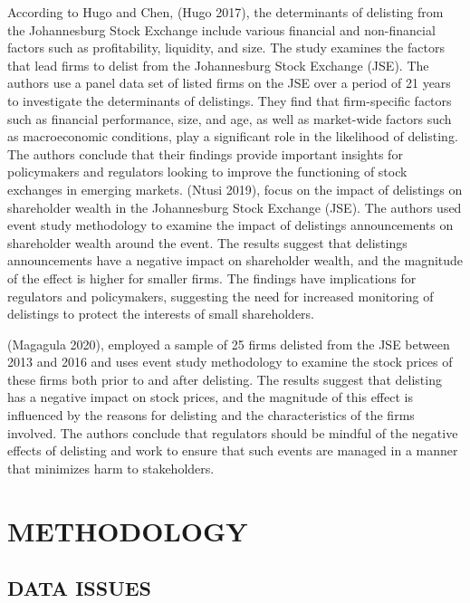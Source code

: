 \documentclass[
]{article}
\begin{document}
According to Hugo and Chen, (Hugo 2017), the determinants of delisting
from the Johannesburg Stock Exchange include various financial and
non-financial factors such as profitability, liquidity, and size. The
study examines the factors that lead firms to delist from the
Johannesburg Stock Exchange (JSE). The authors use a panel data set of
listed firms on the JSE over a period of 21 years to investigate the
determinants of delistings. They find that firm-specific factors such as
financial performance, size, and age, as well as market-wide factors
such as macroeconomic conditions, play a significant role in the
likelihood of delisting. The authors conclude that their findings
provide important insights for policymakers and regulators looking to
improve the functioning of stock exchanges in emerging markets. (Ntusi
2019), focus on the impact of delistings on shareholder wealth in the
Johannesburg Stock Exchange (JSE). The authors used event study
methodology to examine the impact of delistings announcements on
shareholder wealth around the event. The results suggest that delistings
announcements have a negative impact on shareholder wealth, and the
magnitude of the effect is higher for smaller firms. The findings have
implications for regulators and policymakers, suggesting the need for
increased monitoring of delistings to protect the interests of small
shareholders.

(Magagula 2020), employed a sample of 25 firms delisted from the JSE
between 2013 and 2016 and uses event study methodology to examine the
stock prices of these firms both prior to and after delisting. The
results suggest that delisting has a negative impact on stock prices,
and the magnitude of this effect is influenced by the reasons for
delisting and the characteristics of the firms involved. The authors
conclude that regulators should be mindful of the negative effects of
delisting and work to ensure that such events are managed in a manner
that minimizes harm to stakeholders.

\hypertarget{methodology}{%
\section{METHODOLOGY}\label{methodology}}

\hypertarget{data-issues}{%
\subsection{DATA ISSUES}\label{data-issues}}
\end{document}
